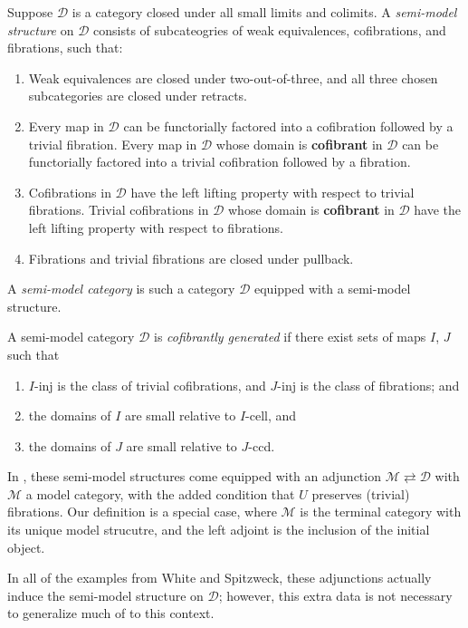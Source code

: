 \documentclass[a4paper,10pt
]{article}%
\renewcommand{\1}{\eta}%
\begin{document}
\begin{definition}
	Suppose $\mathcal D$ is a category closed under all small limits and colimits.
	A \textit{semi-model structure} on $\mathcal D$ consists of
	subcateogries of weak equivalences, cofibrations, and fibrations, such that:
	\begin{enumerate}[label = (\roman*)]
		\item Weak equivalences are closed under two-out-of-three, and all three chosen subcategories are closed under retracts.
		\item Every map in $\mathcal D$ can be functorially factored into a cofibration followed by a trivial fibration.
		Every map in $\mathcal D$ whose domain is \textbf{cofibrant} in $\mathcal D$ can be functorially factored into a trivial cofibration followed by a fibration.
		\item Cofibrations in $\mathcal D$ have the left lifting property with respect to trivial fibrations.
		Trivial cofibrations in $\mathcal D$ whose domain is \textbf{cofibrant} in $\mathcal D$ have the left lifting property with respect to fibrations.
		\item Fibrations and trivial fibrations are closed under pullback.
	\end{enumerate}
	
	A \textit{semi-model category} is such a category $\mathcal D$ equipped with a semi-model structure.
	
	A semi-model category $\mathcal D$ is \textit{cofibrantly generated} if there exist sets of maps $ I$, $ J$ such that
	\begin{enumerate}[label = (\roman*)]
		\item $ I$-inj is the class of trivial cofibrations, and $ J$-inj is the class of fibrations; and
		\item the domains of $ I$ are small relative to $ I$-cell, and
		\item the domains of $ J$ are small relative to $ J$-ccd.
	\end{enumerate}
\end{definition}

\begin{remark}
	In \cite{Spi01,Wh16}, these semi-model structures come equipped with an adjunction $\mathcal M \rightleftarrows \mathcal D$ with $\mathcal M$ a model category,
	with the added condition that $U$ preserves (trivial) fibrations.
	Our definition is a special case, where $\mathcal M$ is the terminal category with its unique model strucutre,
	and the left adjoint is the inclusion of the initial object.
	
	In all of the examples from White and Spitzweck, these adjunctions actually induce the semi-model structure on $\mathcal D$;
	however, this extra data is not necessary to generalize much of \cite{Hov99} to this context.
\end{remark}
\end{document}
